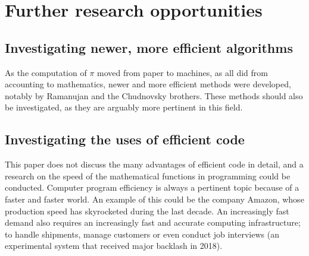 \section{Further research opportunities}

\subsection{Investigating newer, more efficient algorithms}

As the computation of $\pi$ moved from paper to machines, as all did from accounting to mathematics, newer and more efficient methods were developed, notably by Ramanujan and the Chudnovsky brothers. These methods should also be investigated, as they are arguably more pertinent in this field. 

\subsection{Investigating the uses of efficient code}

This paper does not discuss the many advantages of efficient code in detail, and a research on the speed of the mathematical functions in programming could be conducted. Computer program efficiency is always a pertinent topic because of a faster and faster world. An example of this could be the company Amazon, whose production speed has skyrocketed during the last decade. An increasingly fast demand also requires an increasingly fast and accurate computing infrastructure; to handle shipments, manage customers or even conduct job interviews (an experimental system that received major backlash in 2018). \cite{murad_2021}